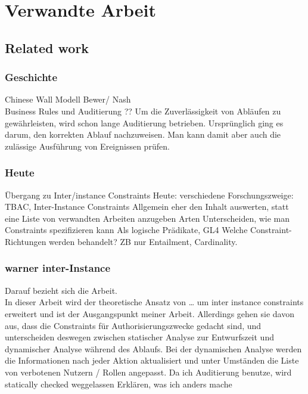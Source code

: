 
\chapter{Verwandte Arbeit} %

\label{Chapter3} %



\section{Related work}


\subsection{Geschichte}
Chinese Wall Modell Bewer/ Nash\\
Business Rules und Auditierung ??
Um die Zuverlässigkeit von Abläufen zu gewährleisten, wird schon lange Auditierung betrieben. Ursprünglich ging es darum, den korrekten Ablauf nachzuweisen. Man kann damit aber auch die zulässige Ausführung von Ereignissen prüfen.
\subsection{Heute}
Übergang zu Inter/instance Constraints
Heute: verschiedene Forschungszweige: TBAC, Inter-Instance Constraints
Allgemein eher den Inhalt auswerten, statt eine Liste von verwandten Arbeiten anzugeben
Arten Unterscheiden, wie man Constraints spezifizieren kann
Als logische Prädikate, GL4
Welche Constraint-Richtungen werden behandelt?
ZB nur Entailment, Cardinality. 
\subsection{warner inter-Instance}
Darauf bezieht sich die Arbeit.\\
In dieser Arbeit wird der theoretische Ansatz von … um inter instance constraints erweitert und ist der Ausgangspunkt meiner Arbeit. Allerdings gehen sie davon aus, dass die Constraints für Authorisierungszwecke gedacht sind, und unterscheiden deswegen zwischen statischer Analyse zur Entwurfszeit und dynamischer Analyse während des Ablaufs. Bei der dynamischen Analyse werden die Informationen nach jeder Aktion  aktualisiert und unter Umständen die Liste von verbotenen Nutzern / Rollen angepasst.
Da ich Auditierung benutze, wird statically checked weggelassen
Erklären, was ich anders mache
